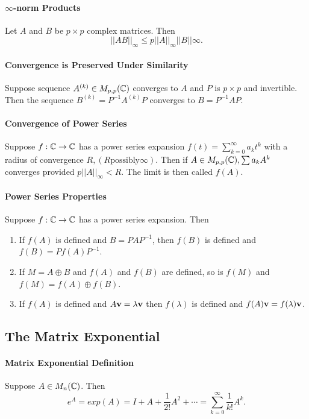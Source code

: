 \paragraph{\(\infty\)-norm Products}
Let \(A\) and \(B\) be \(p \times p\) complex matrices. Then
\[||AB||_\infty \leq p||A||_\infty||B||\infty.\]

\paragraph{Convergence is Preserved Under Similarity}
Suppose sequence \(A^{(k)} \in M_{p,p}(\mathbb{C})\) converges to \(A\) and \(P\) is \(p \times p\) and invertible. Then the sequence \(B^{(k)} = P^{-1}A^{(k)}P\) converges to \(B = P^{-1}AP\).

\paragraph{Convergence of Power Series}
Suppose \(f: \mathbb{C} \to \mathbb{C}\) has a power series expansion \(f(t) = \sum_{k=0}^\infty a_kt^k\) with a radius of convergence \(R, (R \text{possibly} \infty)\). Then if \(A \in M_{p,p}(\mathbb{C}), \sum a_kA^k\) converges provided \(p||A||_\infty < R\). The limit is then called \(f(A)\).

\paragraph{Power Series Properties}
Suppose \(f: \mathbb{C} \to \mathbb{C}\) has a power series expansion. Then
\begin{enumerate}
    \item If \(f(A)\) is defined and \(B = PAP^{-1}\), then \(f(B)\) is defined and \(f(B) = Pf(A)P^{-1}\).
    \item If \(M = A \oplus B\) and \(f(A)\) and \(f(B)\) are defined, so is \(f(M)\) and \(f(M) = f(A) \oplus f(B)\).
    \item If \(f(A)\) is defined and \(A\mathbf{v} = \lambda\mathbf{v}\) then \(f(\lambda)\) is defined and \(f(A)\mathbf{v} = f(\lambda)\mathbf{v}\).
\end{enumerate}

\subsection{The Matrix Exponential}
\paragraph{Matrix Exponential Definition}
Suppose \(A \in M_n(\mathbb{C})\). Then
\[e^A = exp(A) = I + A + \frac{1}{2!}A^2 + \cdots = \sum_{k=0}^\infty \frac{1}{k!}A^k.\]


